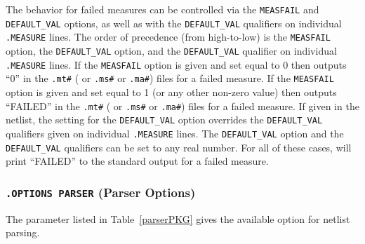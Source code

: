 The \Xyce{} behavior for failed measures can be controlled via the \texttt{MEASFAIL}
and \texttt{DEFAULT\_VAL} options, as well as with the \texttt{DEFAULT\_VAL} 
qualifiers on individual \texttt{.MEASURE} lines.  The order of precedence (from 
high-to-low) is the \texttt{MEASFAIL} option, the \texttt{DEFAULT\_VAL} option, 
and the \texttt{DEFAULT\_VAL} qualifier on individual \texttt{.MEASURE} lines.  
If the \texttt{MEASFAIL} option is given and set equal to 0 then \Xyce{} outputs 
``0'' in the \texttt{.mt\#} ( or \texttt{.ms\#} or \texttt{.ma\#}) files for a failed measure.  
If the \texttt{MEASFAIL} option is given and set equal to 1 (or any other non-zero 
value) then \Xyce{} outputs ``FAILED'' in the \texttt{.mt\#} ( or \texttt{.ms\#} or \texttt{.ma\#}) 
files for a failed measure.  If given in the netlist, the setting for the 
\texttt{DEFAULT\_VAL} option overrides the \texttt{DEFAULT\_VAL} qualifiers given 
on individual \texttt{.MEASURE} lines.  The \texttt{DEFAULT\_VAL} option and the 
\texttt{DEFAULT\_VAL} qualifiers can be set to any real number.  For all of these 
cases, \Xyce{} will print ``FAILED'' to the standard output for a failed measure. 



\subsubsection{\texttt{.OPTIONS PARSER} (Parser Options)}
The parameter listed in Table~\ref{parserPKG} gives the available
option for netlist parsing.




